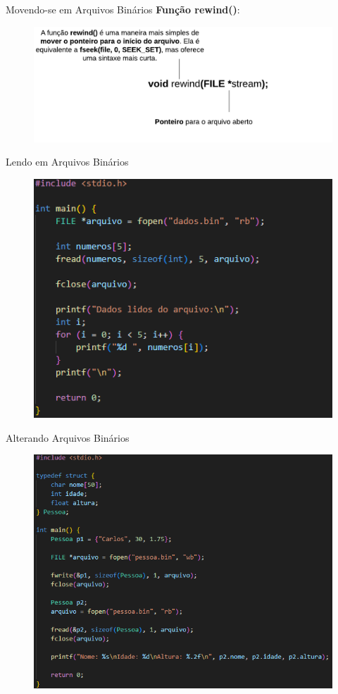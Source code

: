 \begin{frame}{Movendo-se em Arquivos Binários}
\textbf{Função rewind()}:
    \begin{figure}
        \centering
        \includegraphics[width=1\linewidth]{figuras/movebin3.png}
    \end{figure}

\end{frame}


\begin{frame}{Lendo em Arquivos Binários}
\begin{figure}
    \centering
    \includegraphics[width=0.75\linewidth]{figuras/binRead.png}
\end{figure}

\end{frame}

\begin{frame}{Alterando Arquivos Binários}
\begin{figure}
    \centering
    \includegraphics[width=0.75\linewidth]{figuras/binEdit.png}
\end{figure}

\end{frame}


